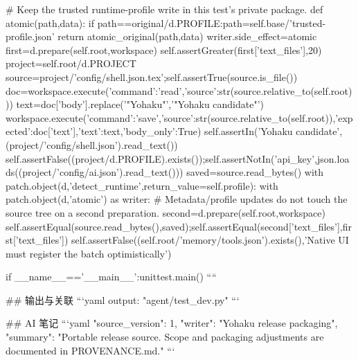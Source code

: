             # Keep the trusted runtime-profile write in this test's private package.
            def atomic(path,data):
                if path==original/d.PROFILE:path=self.base/'trusted-profile.json'
                return atomic_original(path,data)
            writer.side_effect=atomic
            first=d.prepare(self.root,workspace)
        self.assertGreater(first['text_files'],20)
        project=self.root/d.PROJECT
        source=project/'config/shell.json.tex';self.assertTrue(source.is_file())
        doc=workspace.execute({'command':'read','source':str(source.relative_to(self.root))})
        text=doc['body'].replace('"Yohaku"','"Yohaku candidate"')
        workspace.execute({'command':'save','source':str(source.relative_to(self.root)),'expected':doc['text'],'text':text,'body_only':True})
        self.assertIn('Yohaku candidate',(project/'config/shell.json').read_text())
        self.assertFalse((project/d.PROFILE).exists());self.assertNotIn('api_key',json.loads((project/'config/ai.json').read_text()))
        saved=source.read_bytes()
        with patch.object(d,'detect_runtime',return_value=self.profile):
            with patch.object(d,'atomic') as writer:
                # Metadata/profile updates do not touch the source tree on a second preparation.
                second=d.prepare(self.root,workspace)
        self.assertEqual(source.read_bytes(),saved);self.assertEqual(second['text_files'],first['text_files'])
        self.assertFalse((self.root/'memory/tools.json').exists(),'Native UI must register the batch optimistically')

if __name__=='__main__':unittest.main()
````

## 输出与关联
```yaml
output: "agent/test_dev.py"
```

## AI 笔记
```yaml
{"source_version": 1, "writer": "Yohaku release packaging", "summary": "Portable release source. Scope and packaging adjustments are documented in PROVENANCE.md."}
```
